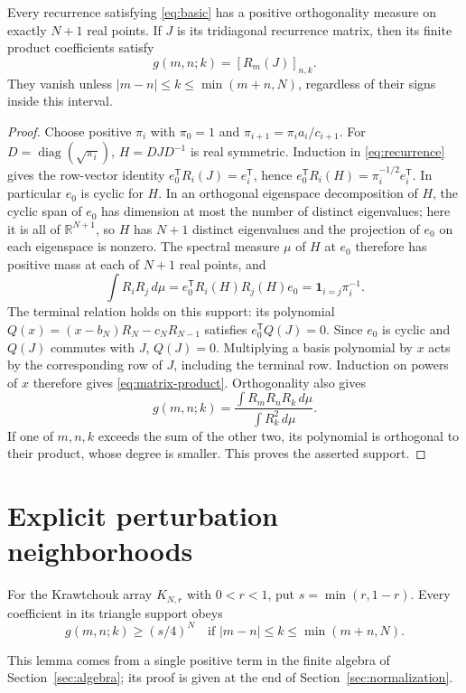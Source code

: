 \begin{lemma}\label{lem:finite}
Every recurrence satisfying \eqref{eq:basic} has a positive orthogonality measure on exactly $N+1$ real points. If $J$ is its tridiagonal recurrence matrix, then its finite product coefficients satisfy
\begin{equation}\label{eq:matrix-product}
g(m,n;k)=[R_m(J)]_{n,k}.
\end{equation}
They vanish unless $|m-n|\leq k\leq\min(m+n,N)$, regardless of their signs inside this interval.
\end{lemma}
\begin{proof}
Choose positive $\pi_i$ with $\pi_0=1$ and $\pi_{i+1}=\pi_i a_i/c_{i+1}$. For $D=\operatorname{diag}(\sqrt{\pi_i})$, $H=DJD^{-1}$ is real symmetric. Induction in \eqref{eq:recurrence} gives the row-vector identity $e_0^\mathsf T R_i(J)=e_i^\mathsf T$, hence $e_0^\mathsf T R_i(H)=\pi_i^{-1/2}e_i^\mathsf T$. In particular $e_0$ is cyclic for $H$. In an orthogonal eigenspace decomposition of $H$, the cyclic span of $e_0$ has dimension at most the number of distinct eigenvalues; here it is all of $\mathbb R^{N+1}$, so $H$ has $N+1$ distinct eigenvalues and the projection of $e_0$ on each eigenspace is nonzero. The spectral measure $\mu$ of $H$ at $e_0$ therefore has positive mass at each of $N+1$ real points, and
\[
\int R_iR_j\,d\mu=e_0^\mathsf TR_i(H)R_j(H)e_0
=\boldsymbol1_{i=j}\pi_i^{-1}.
\]
The terminal relation holds on this support: its polynomial $Q(x)=(x-b_N)R_N-c_NR_{N-1}$ satisfies $e_0^\mathsf TQ(J)=0$. Since $e_0$ is cyclic and $Q(J)$ commutes with $J$, $Q(J)=0$.
Multiplying a basis polynomial by $x$ acts by the corresponding row of $J$, including the terminal row. Induction on powers of $x$ therefore gives \eqref{eq:matrix-product}. Orthogonality also gives
\[
g(m,n;k)=\frac{\int R_mR_nR_k\,d\mu}{\int R_k^2\,d\mu}.
\]
If one of $m,n,k$ exceeds the sum of the other two, its polynomial is orthogonal to their product, whose degree is smaller. This proves the asserted support.
\end{proof}

\section{Explicit perturbation neighborhoods}\label{sec:perturbation}

\begin{lemma}\label{lem:margin}
For the Krawtchouk array $K_{N,r}$ with $0<r<1$, put $s=\min(r,1-r)$. Every coefficient in its triangle support obeys
\begin{equation}\label{eq:margin}
g(m,n;k)\geq (s/4)^N\quad\text{if }|m-n|\leq k\leq\min(m+n,N).
\end{equation}
\end{lemma}
This lemma comes from a single positive term in the finite algebra of Section~\ref{sec:algebra}; its proof is given at the end of Section~\ref{sec:normalization}.

